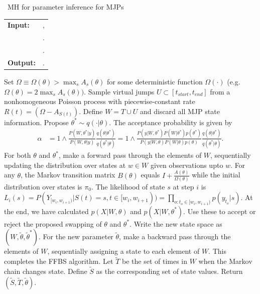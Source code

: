 \begin{algorithm}[H]
   \caption{\Naive\  MH for parameter inference for MJPs }
   \label{alg:MH_naive}
  \begin{tabular}{l l}
   \textbf{Input:  } & \text{A set of partial and noisy observations $X$}, \\
                      & \text{The previous MJP path $S(t) = (S, T)$, the previous MJP parameters $\theta$}.\\ 
                     & \text{A  Metropolis-Hasting proposal $q(\cdot | \theta)$}.\\
   \textbf{Output:  }& \text{A new MJP trajectory $\tilde{S} (t) = (\tilde{S}, \tilde{T})$, 
                            new MJP parameters $\tilde{\theta}$}.\\
   \hline
   \end{tabular}
   \begin{algorithmic}[1]
     \State Set $\Omega \equiv \Omega(\theta) > \max_s{A_s(\theta)}$ for
     some deterministic function $\Omega(\cdot)$ (e.g.\ $\Omega(\theta) = 
      2\max_s A_s(\theta))$.
      \State Sample virtual jumps $U\subset[t_{start}, t_{end}]$ from a 
      nonhomogeneous Poisson process with piecewise-constant rate 
      $R(t) = (\Omega - A_{S(t)})$. 
    Define $W = T \cup U$ and discard all MJP state information.
      \State Propose $\theta^* \sim q(\cdot| \theta)$.
          The acceptance probability is given by 
          \begin{align*}
          \alpha &=  1 \wedge \frac{P(W,\theta^*| y)}{P(W, \theta| y)} \frac{q(\theta|\theta^*)}{q(\theta^*|\theta)}
          =  1 \wedge \frac{P(y| W,\theta^*) P(W | \theta^*)p(\theta^*)}{P(y|W, \theta)P(W | \theta)p(\theta)} \frac{q(\theta|\theta^*)}{q(\theta^*|\theta)}.
          \end{align*}
    \State For both $\theta$ and $\theta^*$, make a forward pass through the 
    elements of $W$, sequentially updating the distribution over states at 
    $w \in W$ given observations upto $w$. 
    For any $\theta$, the Markov transition matrix 
    $B(\theta)$ equals $I + \frac{A(\theta)}{\Omega(\theta)}$ while the initial distribution
      over states is $\pi_0$. The likelihood of state $s$ at step $i$ is 
      $ L_i(s) = P(Y_{[w_i, w_{i + 1})} | S(t) = s , t \in [w_i, w_{i + 1})) = 
      \prod_{o: t_o \in [w_i, w_{i + 1})}p(y_{t_o} | s)$.
    At the end, we have calculated
    $p(X|W,\theta)$ and $p(X|W,\theta^*)$. Use these to accept or reject the
    proposed swapping of $\theta$ and $\theta^*$. Write the new state space
    as $(W,\tilde{\theta},\tilde{\theta}^*)$.
    \State For the new parameter $\tilde{\theta}$, make a backward pass through 
    the elements of
    $W$, sequentially assigning a state to each element of $W$. This
    completes the FFBS algorithm.
    \State Let $\tilde{T}$ be the set of times in $W$ when the Markov chain changes state. Define $\tilde{S}$ as the corresponding set of state values. Return $(\tilde{S}, \tilde{T}, \tilde{\theta})$.
\end{algorithmic}
\end{algorithm}
